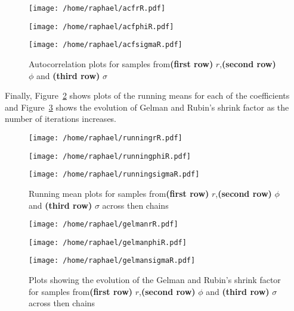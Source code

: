 \documentclass{article}
\begin{document}
	\begin{figure}[htb]
		\centering
		\begin{minipage}{0.6\textwidth}
			\centering
			\texttt{[image: /home/raphael/acfrR.pdf]}
		\end{minipage}
		\begin{minipage}{0.6\textwidth}
			\centering
			\texttt{[image: /home/raphael/acfphiR.pdf]}
		\end{minipage}
		\begin{minipage}{0.6\textwidth}
			\centering
			\texttt{[image: /home/raphael/acfsigmaR.pdf]}
		\end{minipage}
		\caption{Autocorrelation plots for samples from\textbf{(first row)} $r$,\textbf{(second row)} $\phi$ and \textbf{(third row)} $\sigma$}
		\label{fig:acf}
	\end{figure}

Finally, Figure~\ref{fig:running} shows plots of the running means for each of the coefficients and Figure~\ref{fig:gelman} shows the evolution of Gelman and Rubin's shrink factor as the number of iterations increases.

	\begin{figure}[htb]
		\centering
		\begin{minipage}{0.6\textwidth}
			\centering
			\texttt{[image: /home/raphael/runningrR.pdf]}
		\end{minipage}
		\begin{minipage}{0.6\textwidth}
			\centering
			\texttt{[image: /home/raphael/runningphiR.pdf]}
		\end{minipage}
		\begin{minipage}{0.6\textwidth}
			\centering
			\texttt{[image: /home/raphael/runningsigmaR.pdf]}
		\end{minipage}
		\caption{Running mean plots for samples from\textbf{(first row)} $r$,\textbf{(second row)} $\phi$ and \textbf{(third row)} $\sigma$ across then chains}
		\label{fig:running}
	\end{figure}
	
	\begin{figure}[htb]
		\centering
		\begin{minipage}{0.6\textwidth}
			\centering
			\texttt{[image: /home/raphael/gelmanrR.pdf]}
		\end{minipage}
		\begin{minipage}{0.6\textwidth}
			\centering
			\texttt{[image: /home/raphael/gelmanphiR.pdf]}
		\end{minipage}
		\begin{minipage}{0.6\textwidth}
			\centering
			\texttt{[image: /home/raphael/gelmansigmaR.pdf]}
		\end{minipage}
		\caption{Plots showing the evolution of the  Gelman and Rubin's shrink factor for samples from\textbf{(first row)} $r$,\textbf{(second row)} $\phi$ and \textbf{(third row)} $\sigma$ across then chains}
		\label{fig:gelman}
	\end{figure}
	
\end{document}
